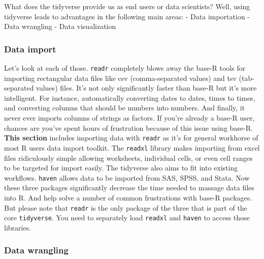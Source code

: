 \documentclass[
]{article}
\begin{document}
What does the tidyverse provide us as end users or data scientists? Well, using tidyverse leads to advantages in the following main areas:
- Data importation
- Data wrangling
- Data visualization

\hypertarget{data-import}{%
\subsubsection{Data import}\label{data-import}}

Let's look at each of those. \texttt{readr} completely blows away the base-R tools for importing rectangular data files like csv (comma-separated values) and tsv (tab-separated values) files. It's not only significantly faster than base-R but it's more intelligent. For instance, automatically converting dates to dates, times to times, and converting columns that should be numbers into numbers. And finally, it never ever imports columns of strings as factors. If you're already a base-R user, chances are you've spent hours of frustration because of this issue using base-R. \textbf{This section} includes importing data with \texttt{readr} as it's for general workhorse of most R users data import toolkit. The \texttt{readxl} library makes importing from excel files ridiculously simple allowing worksheets, individual cells, or even cell ranges to be targeted for import easily. The tidyverse also aims to fit into existing workflows. \texttt{haven} allows data to be imported from SAS, SPSS, and Stata. Now these three packages significantly decrease the time needed to massage data files into R. And help solve a number of common frustrations with base-R packages. But please note that \texttt{readr} is the only package of the three that is part of the core \texttt{tidyverse}. You need to separately load \texttt{readxl} and \texttt{haven} to access those libraries.

\hypertarget{data-wrangling}{%
\subsubsection{Data wrangling}\label{data-wrangling}}
\end{document}

